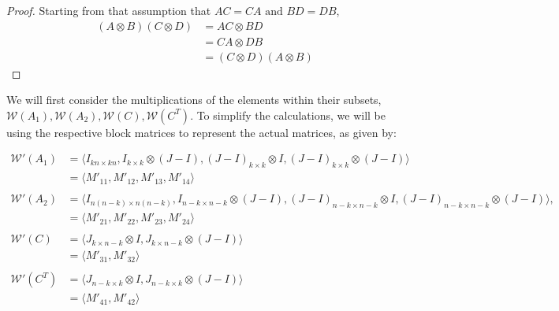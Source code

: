 \documentclass{article}
\begin{document}
\begin{proof} Starting from that assumption that $AC=CA \text{ and } BD=DB$,
\begin{align*}
    (A \otimes B)(C \otimes D) &= AC \otimes BD \\
    &= CA\otimes DB \\
    &= (C\otimes D)(A\otimes B)
\end{align*}
\end{proof}


We will first consider the multiplications of the elements within their subsets, $\mathcal{W}(A_1), \mathcal{W}(A_2), \mathcal{W}(C), \mathcal{W}(C^T)$. To simplify the calculations, we will be using the respective block matrices to represent the actual matrices, as given by:

\begin{align*}
    \mathcal{W'}(A_1) 
    &= \langle I_{kn\times kn}, I_{k\times k} \otimes (J-I),(J-I)_{k\times k} \otimes I,(J-I)_{k\times k} \otimes (J-I) \rangle \\
    &= \langle M'_{11}, M'_{12}, M'_{13}, M'_{14} \rangle \\ \\
    \mathcal{W'}(A_2) 
    &=\langle I_{n(n-k)\times n(n-k)}, I_{n-k\times n-k} \otimes (J-I),(J-I)_{n-k\times n-k} \otimes I,(J-I)_{n-k\times n-k} \otimes (J-I)\rangle, \\ 
    &=\langle M'_{21}, M'_{22}, M'_{23}, M'_{24} \rangle \\ \\
    \mathcal{W'}(C) 
    &= \langle J_{k\times n-k}\otimes I, J_{k\times n-k}\otimes (J-I)\rangle \\
    &= \langle M'_{31}, M'_{32} \rangle \\ \\
    \mathcal{W'}(C^T) 
    &= \langle J_{n-k \times k}\otimes I, J_{n-k \times k}\otimes (J-I)\rangle \\
    &= \langle M'_{41}, M'_{42} \rangle
\end{align*}
\end{document}
